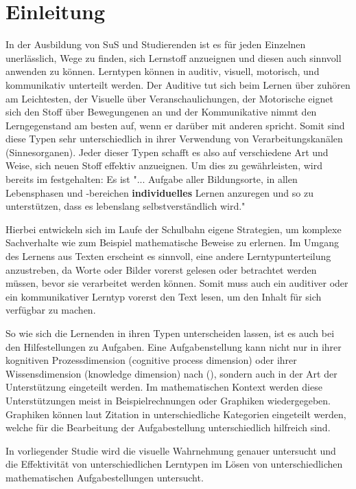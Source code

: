 \chapter{Einleitung}

In der Ausbildung von \gls{SuS} und Studierenden ist es für jeden Einzelnen unerlässlich, Wege zu finden, sich Lernstoff anzueignen und diesen auch sinnvoll anwenden zu können. Lerntypen können in auditiv, visuell, motorisch, und kommunikativ unterteilt werden. Der Auditive tut sich beim Lernen über zuhören am Leichtesten, der Visuelle über Veranschaulichungen, der Motorische eignet sich den Stoff über Bewegungenen an und der Kommunikative nimmt den Lerngegenstand am besten auf, wenn er darüber mit anderen spricht.  Somit sind diese Typen sehr unterschiedlich in ihrer Verwendung von Verarbeitungskanälen (Sinnesorganen).
Jeder dieser Typen schafft es also auf verschiedene Art und Weise, sich neuen Stoff effektiv anzueignen.
Um dies zu gewährleisten, wird bereits im \cite{LehrplanGrundschule} festgehalten:
Es ist "... Aufgabe aller Bildungsorte, in allen Lebensphasen und -bereichen \textbf{individuelles}
Lernen anzuregen und so zu unterstützen, dass es lebenslang selbstverständlich wird."

Hierbei entwickeln sich im Laufe der Schulbahn eigene Strategien, um komplexe Sachverhalte
wie zum Beispiel mathematische Beweise zu erlernen. 
Im Umgang des Lernens aus Texten erscheint es sinnvoll, eine andere Lerntypunterteilung anzustreben, da Worte oder Bilder vorerst gelesen oder betrachtet werden müssen, bevor sie verarbeitet werden können. Somit muss auch ein auditiver oder ein kommunikativer Lerntyp vorerst den Text lesen, um den Inhalt für sich verfügbar zu machen. 

So wie sich die Lernenden in ihren Typen unterscheiden lassen, ist es auch bei den Hilfestellungen zu Aufgaben. Eine Aufgabenstellung kann nicht nur in ihrer kognitiven Prozessdimension (cognitive process dimension) oder ihrer Wissensdimension (knowledge dimension) nach \citeauthor{anderson2001taxonomy} (), sondern auch in der Art der Unterstützung eingeteilt werden. Im mathematischen Kontext werden diese Unterstützungen meist in Beispielrechnungen oder Graphiken wiedergegeben. Graphiken können laut Zitation in unterschiedliche Kategorien eingeteilt werden, welche für die Bearbeitung der Aufgabestellung unterschiedlich hilfreich sind. 

In vorliegender Studie wird die visuelle Wahrnehmung genauer untersucht und die Effektivität von unterschiedlichen Lerntypen im Lösen von unterschiedlichen mathematischen Aufgabestellungen untersucht. 